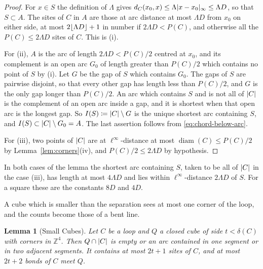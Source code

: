 \documentclass[11pt]{preprint}
\newcommand{\diam}{\operatorname{diam}}
\DeclarePairedDelimiter{\abs}{\lvert}{\rvert}
\DeclarePairedDelimiter{\floor}{\lfloor}{\rfloor}
\numberwithin{equation}{section}
\newtheorem{lemma}[theorem]{Lemma}
\theoremstyle{definition}
\theoremstyle{remark}
\theoremstyle{plain}
\begin{document}
\begin{proof}
For $x \in S$ the definition of $\Lambda$ gives $d_C(x_0, x) \leq \Lambda\abs{x - x_0}_\infty \leq \Lambda D$, so that $S \subset A$. The sites of $C$ in $A$ are those at arc distance at most $\Lambda D$ from $x_0$ on either side, at most $2\floor{\Lambda D} + 1$ in number if $2\Lambda D < P(C)$, and otherwise all the $P(C) \leq 2\Lambda D$ sites of $C$. This is (i).

For (ii), $A$ is the arc of length $2\Lambda D < P(C)/2$ centred at $x_0$, and its complement is an open arc $G_0$ of length greater than $P(C)/2$ which contains no point of $S$ by (i). Let $G$ be the gap of $S$ which contains $G_0$. The gaps of $S$ are pairwise disjoint, so that every other gap has length less than $P(C)/2$, and $G$ is the only gap longer than $P(C)/2$. An arc which contains $S$ and is not all of $\abs{C}$ is the complement of an open arc inside a gap, and it is shortest when that open arc is the longest gap. So $I(S) \coloneqq \abs{C} \setminus G$ is the unique shortest arc containing $S$, and $I(S) \subset \abs{C} \setminus G_0 = A$. The last assertion follows from \eqref{eq:chord-below-arc}.

For (iii), two points of $\abs{C}$ are at $\ell^\infty$-distance at most $\diam(C) \leq P(C)/2$ by Lemma~\ref{lem:corners}(iv), and $P(C)/2 \leq 2\Lambda D$ by hypothesis.
\end{proof}

In both cases of the lemma the shortest arc containing $S$, taken to be all of $\abs{C}$ in the case (iii), has length at most $4\Lambda D$ and lies within $\ell^\infty$-distance $2\Lambda D$ of $S$. For a square these are the constants $8D$ and $4D$.

A cube which is smaller than the separation sees at most one corner of the loop, and the counts become those of a bent line.

\begin{lemma}[Small Cubes]\label{lem:small-cubes}
Let $C$ be a loop and $Q$ a closed cube of side $t < \delta(C)$ with corners in $\mathbb Z^4$. Then $Q \cap \abs{C}$ is empty or an arc contained in one segment or in two adjacent segments. It contains at most $2t + 1$ sites of $C$, and at most $2t + 2$ bonds of $C$ meet $Q$.
\end{lemma}
\end{document}
